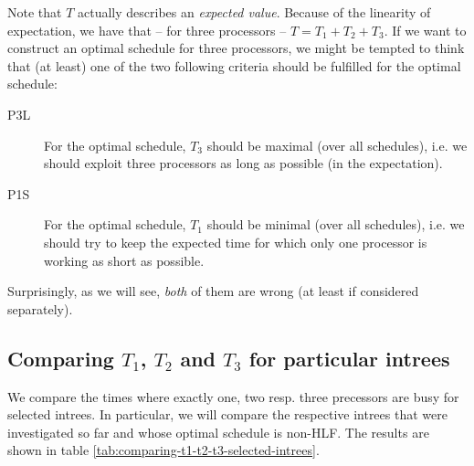 Note that $T$ actually describes an \emph{expected value}. Because of the linearity of expectation, we have that -- for three processors -- $T=T_1 + T_2 + T_3$. If we want to construct an optimal schedule for three processors, we might be tempted to think that (at least) one of the two following criteria should be fulfilled for the optimal schedule:

\begin{description}
\item[P3L] For the optimal schedule, $T_3$ should be maximal (over all schedules), i.e. we should exploit three processors as long as possible (in the expectation).
\item[P1S] For the optimal schedule, $T_1$ should be minimal (over all schedules), i.e. we should try to keep the expected time for which only one processor is working as short as possible.
\end{description}

Surprisingly, as we will see, \emph{both} of them are wrong (at least if considered separately).

\subsection{Comparing $T_1$, $T_2$ and $T_3$ for particular intrees}
\label{sec:comparing-t1-t2-t3-particular-intrees}

We compare the times where exactly one, two resp. three precessors are busy for selected intrees. In particular, we will compare the respective intrees that were investigated so far and whose optimal schedule is non-HLF. The results are shown in table \ref{tab:comparing-t1-t2-t3-selected-intrees}.

